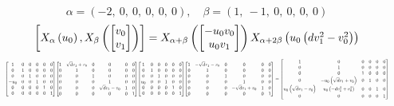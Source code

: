 \documentclass[11pt]{article}
\theoremstyle{definition}
\begin{document}
\providecommand{\scaletoalign}[2]{%
  \sbox0{$#2$}%
  \ifdim\wd0>#1\relax 
    \resizebox{#1}{!}{\usebox0}%
  \else 
    \usebox0%
  \fi 
}
\[
\alpha = \left( -2, \  0, \  0, \  0, \  0, \  0\right), \quad \beta = \left( 1, \  -1, \  0, \  0, \  0, \  0\right)
\]
\[
\scaletoalign{\textwidth}{\left[ X_{\alpha}\left(u_{0}\right), X_{\beta}\left(\left[\begin{matrix}v_{0}\\v_{1}\end{matrix}\right]\right) \right] = X_{\alpha + \beta}\left(\left[\begin{matrix}- u_{0} v_{0}\\u_{0} v_{1}\end{matrix}\right]\right) X_{\alpha + 2\beta}\left(u_{0} \left(d v_{1}^{2} - v_{0}^{2}\right)\right)}
\]
\[
\scaletoalign{\textwidth}{{\left[\begin{matrix}1 & 0 & 0 & 0 & 0 & 0\\0 & 1 & 0 & 0 & 0 & 0\\0 & 0 & 1 & 0 & 0 & 0\\- u_{0} & 0 & 0 & 1 & 0 & 0\\0 & 0 & 0 & 0 & 1 & 0\\0 & 0 & 0 & 0 & 0 & 1\end{matrix}\right]} {\left[\begin{matrix}1 & \sqrt{d} v_{1} + v_{0} & 0 & 0 & 0 & 0\\0 & 1 & 0 & 0 & 0 & 0\\0 & 0 & 1 & 0 & 0 & 0\\0 & 0 & 0 & 1 & 0 & 0\\0 & 0 & 0 & \sqrt{d} v_{1} - v_{0} & 1 & 0\\0 & 0 & 0 & 0 & 0 & 1\end{matrix}\right]} {\left[\begin{matrix}1 & 0 & 0 & 0 & 0 & 0\\0 & 1 & 0 & 0 & 0 & 0\\0 & 0 & 1 & 0 & 0 & 0\\u_{0} & 0 & 0 & 1 & 0 & 0\\0 & 0 & 0 & 0 & 1 & 0\\0 & 0 & 0 & 0 & 0 & 1\end{matrix}\right]} {\left[\begin{matrix}1 & - \sqrt{d} v_{1} - v_{0} & 0 & 0 & 0 & 0\\0 & 1 & 0 & 0 & 0 & 0\\0 & 0 & 1 & 0 & 0 & 0\\0 & 0 & 0 & 1 & 0 & 0\\0 & 0 & 0 & - \sqrt{d} v_{1} + v_{0} & 1 & 0\\0 & 0 & 0 & 0 & 0 & 1\end{matrix}\right]} = {\left[\begin{matrix}1 & 0 & 0 & 0 & 0 & 0\\0 & 1 & 0 & 0 & 0 & 0\\0 & 0 & 1 & 0 & 0 & 0\\0 & - u_{0} \left(\sqrt{d} v_{1} + v_{0}\right) & 0 & 1 & 0 & 0\\u_{0} \left(\sqrt{d} v_{1} - v_{0}\right) & u_{0} \left(- d v_{1}^{2} + v_{0}^{2}\right) & 0 & 0 & 1 & 0\\0 & 0 & 0 & 0 & 0 & 1\end{matrix}\right]}}
\]
\end{document}
